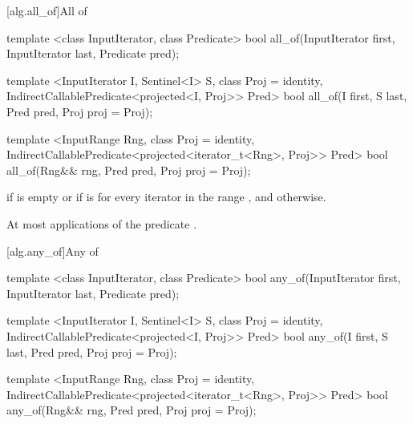 [alg.all_of]{All of}

%
\begin{removedblock}
\begin{itemdecl}
template <class InputIterator, class Predicate>
  bool all_of(InputIterator first, InputIterator last, Predicate pred);
\end{itemdecl}
\end{removedblock}
\begin{addedblock}
\begin{itemdecl}
template <InputIterator I, Sentinel<I> S, class Proj = identity,
    IndirectCallablePredicate<projected<I, Proj>> Pred>
  bool all_of(I first, S last, Pred pred, Proj proj = Proj{});

template <InputRange Rng, class Proj = identity,
    IndirectCallablePredicate<projected<iterator_t<Rng>, Proj>> Pred>
  bool all_of(Rng&& rng, Pred pred, Proj proj = Proj{});
\end{itemdecl}
\end{addedblock}

\begin{itemdescr}
\pnum
\returns {} if
 is empty or if
is  for every iterator  in the range ,
and  otherwise.

\pnum
\complexity At most  applications of the predicate
.
\end{itemdescr}

[alg.any_of]{Any of}

%
\begin{removedblock}
\begin{itemdecl}
template <class InputIterator, class Predicate>
  bool any_of(InputIterator first, InputIterator last, Predicate pred);
\end{itemdecl}
\end{removedblock}
\begin{addedblock}
\begin{itemdecl}
template <InputIterator I, Sentinel<I> S, class Proj = identity,
    IndirectCallablePredicate<projected<I, Proj>> Pred>
  bool any_of(I first, S last, Pred pred, Proj proj = Proj{});

template <InputRange Rng, class Proj = identity,
    IndirectCallablePredicate<projected<iterator_t<Rng>, Proj>> Pred>
  bool any_of(Rng&& rng, Pred pred, Proj proj = Proj{});
\end{itemdecl}
\end{addedblock}

